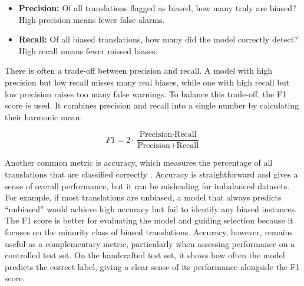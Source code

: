 \begin{itemize}
    \item \textbf{Precision:} Of all translations flagged as biased, how many truly are biased? High precision means fewer false alarms.
    \item \textbf{Recall:} Of all biased translations, how many did the model correctly detect? High recall means fewer missed biases.
\end{itemize}

There is often a trade-off between precision and recall. A model with high precision but low recall misses many real biases, while one with high recall but low precision raises too many false warnings. To balance this trade-off, the F1 score is used. It combines precision and recall into a single number by calculating their harmonic mean:

\vspace{0.4em}
\[
F1 = 2 \cdot \frac{\text{Precision} \cdot \text{Recall}}{\text{Precision} + \text{Recall}}
\]
\vspace{0.4em}

Another common metric is accuracy, which measures the percentage of all translations that are classified correctly \parencite{rainioEvaluationMetricsStatistical2024}. Accuracy is straightforward and gives a sense of overall performance, but it can be misleading for imbalanced datasets. For example, if most translations are unbiased, a model that always predicts “unbiased” would achieve high accuracy but fail to identify any biased instances. The F1 score is better for evaluating the model and guiding selection because it focuses on the minority class of biased translations. Accuracy, however, remains useful as a complementary metric, particularly when assessing performance on a controlled test set. On the handcrafted test set, it shows how often the model predicts the correct label, giving a clear sense of its performance alongside the F1 score.